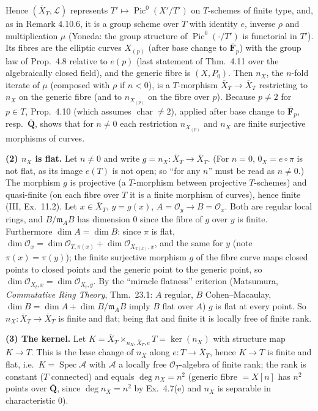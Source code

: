 \documentclass[11pt]{article}
\begin{document}
Hence $(\overline X_T,\mathcal L)$ represents $T'\mapsto\operatorname{Pic}^0(X'/T')$ on $T$-schemes of finite type, and, as in Remark 4.10.6, it is a group scheme over $T$ with identity $e$, inverse $\rho$ and multiplication $\mu$ (Yoneda: the group structure of $\operatorname{Pic}^0(\cdot/T')$ is functorial in $T'$). Its fibres are the elliptic curves $X_{(p)}$ (after base change to $\overline{\mathbf F}_p$) with the group law of Prop.~4.8 relative to $e(p)$ (last statement of Thm.~4.11 over the algebraically closed field), and the generic fibre is $(X,P_0)$. Then $n_X$, the $n$-fold iterate of $\mu$ (composed with $\rho$ if $n<0$), is a $T$-morphism $\overline X_T\to\overline X_T$ restricting to $n_X$ on the generic fibre (and to $n_{X_{(p)}}$ on the fibre over $p$). Because $p\ne2$ for $p\in T$, Prop.~4.10 (which assumes $\operatorname{char}\neq2$), applied after base change to $\overline{\mathbf F}_p$, resp.\ $\overline{\mathbf Q}$, shows that for $n\ne0$ each restriction $n_{X_{(p)}}$ and $n_X$ are finite surjective morphisms of curves.

\textbf{(2) $n_X$ is flat.} Let $n\ne0$ and write $g=n_X:\overline X_T\to\overline X_T$. (For $n=0$, $0_X=e\circ\pi$ is not flat, as its image $e(T)$ is not open; so ``for any $n$'' must be read as $n\ne0$.) The morphism $g$ is projective (a $T$-morphism between projective $T$-schemes) and quasi-finite (on each fibre over $T$ it is a finite morphism of curves), hence finite (III, Ex.~11.2). Let $x\in\overline X_T$, $y=g(x)$, $A=\mathcal O_y\to B=\mathcal O_x$. Both are regular local rings, and $B/\mathfrak m_AB$ has dimension $0$ since the fibre of $g$ over $y$ is finite. Furthermore $\dim A=\dim B$: since $\pi$ is flat, $\dim\mathcal O_x=\dim\mathcal O_{T,\pi(x)}+\dim\mathcal O_{X_{\pi(x)},x}$, and the same for $y$ (note $\pi(x)=\pi(y)$); the finite surjective morphism $g$ of the fibre curve maps closed points to closed points and the generic point to the generic point, so $\dim\mathcal O_{X_t,x}=\dim\mathcal O_{X_t,y}$. By the ``miracle flatness'' criterion (Matsumura, \emph{Commutative Ring Theory}, Thm.~23.1: $A$ regular, $B$ Cohen--Macaulay, $\dim B=\dim A+\dim B/\mathfrak m_AB$ imply $B$ flat over $A$) $g$ is flat at every point. So $n_X:\overline X_T\to\overline X_T$ is finite and flat; being flat and finite it is locally free of finite rank.

\textbf{(3) The kernel.} Let $K=\overline X_T\times_{n_X,\overline X_T,e}T=\ker(n_X)$ with structure map $K\to T$. This is the base change of $n_X$ along $e:T\to\overline X_T$, hence $K\to T$ is finite and flat, i.e.\ $K=\operatorname{Spec}\mathcal A$ with $\mathcal A$ a locally free $\mathcal O_T$-algebra of finite rank; the rank is constant ($T$ connected) and equals $\deg n_X=n^2$ (generic fibre $=X[n]$ has $n^2$ points over $\overline{\mathbf Q}$, since $\deg n_X=n^2$ by Ex.~4.7(e) and $n_X$ is separable in characteristic $0$).
\end{document}

